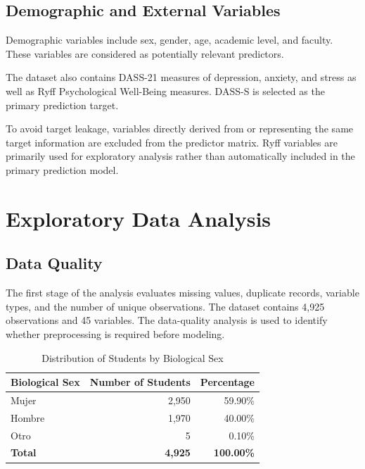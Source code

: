 \documentclass[conference]{IEEEtran}
\begin{document}
\subsection{Demographic and External Variables}

Demographic variables include sex, gender, age, academic level, and faculty. These variables are considered as potentially relevant predictors.

The dataset also contains DASS-21 measures of depression, anxiety, and stress as well as Ryff Psychological Well-Being measures. DASS-S is selected as the primary prediction target.

To avoid target leakage, variables directly derived from or representing the same target information are excluded from the predictor matrix. Ryff variables are primarily used for exploratory analysis rather than automatically included in the primary prediction model.


\section{Exploratory Data Analysis}

\subsection{Data Quality}

The first stage of the analysis evaluates missing values, duplicate records, variable types, and the number of unique observations. The dataset contains 4,925 observations and 45 variables. The data-quality analysis is used to identify whether preprocessing is required before modeling.

\begin{table}[H]
\centering
\caption{Distribution of Students by Biological Sex}
\label{tab:sex_distribution}
\begin{tabular}{lrr}
\toprule
\textbf{Biological Sex} & \textbf{Number of Students} & \textbf{Percentage} \\
\midrule
Mujer  & 2,950 & 59.90\% \\
Hombre & 1,970 & 40.00\% \\
Otro   & 5     & 0.10\% \\
\midrule
\textbf{Total} & \textbf{4,925} & \textbf{100.00\%} \\
\bottomrule
\end{tabular}
\end{table} 
\end{document}
